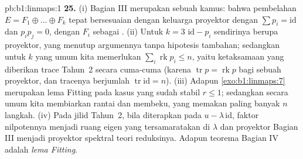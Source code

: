 \begin{solution}{pb:b1:linmaps:1}
\textbf{25.} (i) Bagian III merupakan sebuah kamus: bahwa pembelahan $E = F_1
\oplus \dots \oplus F_k$ tepat bersesuaian dengan keluarga
proyektor dengan $\sum p_i = \mathrm{id}$ dan $p_i p_j = 0$, dengan
$F_i$ sebagai . (ii) Untuk $k = 3$ 
$\mathrm{id} - p_i$ sendirinya berupa proyektor, yang menutup
argumennya tanpa hipotesis tambahan; sedangkan untuk $k$ yang umum kita memerlukan
$\sum_i \operatorname{rk} p_i \leq n$, yaitu ketaksamaan yang diberikan
trace Tahun~2 secara cuma-cuma (karena $\operatorname{tr} p = \operatorname{rk}
p$ bagi sebuah proyektor, dan tracenya berjumlah $\operatorname{tr}
\mathrm{id} = n$). (iii) Adapun \cref{exo:b1:linmaps:7} merupakan lema
Fitting pada kasus yang sudah stabil $r \leq 1$; sedangkan secara umum kita
membiarkan rantai  dan  membeku, yang memakan paling banyak $n$
langkah. (iv) Pada jilid Tahun~2, bila diterapkan pada $u - \lambda\,
\mathrm{id}$, faktor nilpotennya menjadi ruang eigen yang tersamaratakan
di $\lambda$ dan proyektor Bagian III menjadi
proyektor spektral teori reduksinya. Adapun teorema
Bagian IV adalah \emph{lema Fitting}.

\end{solution}
